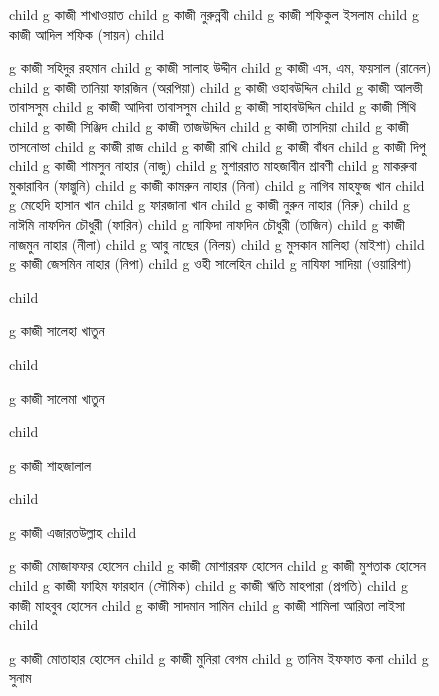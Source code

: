 \documentclass{article}
\begin{document}
\begin{figure}
{\begin{genealogypicture}
{{{{{{        }%
        child{
          g{ কাজী শাখাওয়াত  }
              child{   g{ কাজী নুরুন্নবী }  }
              child{
                g{ কাজী শফিকুল ইসলাম } child{  g{ কাজী আদিল শফিক (সায়ন)  } } 
              }
        }%
        child{
          g{ কাজী সহিদুর রহমান}
 child{    g{ কাজী সালাহ উদ্দীন } 
            child{    g{  কাজী এস, এম, ফয়সাল (রানেল) }   } %
            child{    g{ কাজী তানিয়া ফারজিন (অরপিয়া) }   }
      }
  child{    g{ কাজী ওহাবউদ্দিন  } 
      child{ g{ কাজী আলভী তাবাসসুম }  }
      child{ g{ কাজী আদিবা তাবাসসুম }  }
  }
 child{    g{ কাজী সাহাবউদ্দিন   } 
 child{    g{ কাজী সিঁথি }   }
  child{    g{ কাজী সিঞ্জিদ }   }
      }
  child{    g{ কাজী তাজউদ্দিন  } 
  child{ g{ কাজী তাসদিয়া }  }
 child{    g{ কাজী তাসনোভা }   }
  }
  child{    g{ কাজী রাজ } 
 child{    g{ কাজী রাখি  }   } %
 child{    g{ কাজী বাঁধন }   }
  }
  child{    g{ কাজী দিপু }   }
  child{    g{ কাজী শামসুন নাহার (নাজু)  } 
        child{ g{ মুশাররাত মাহজাবীন শ্রাবণী }  }
        child{ g{ মাকরুবা মুকারাবিন (ফাল্গুনি) }  }
  }
  child{    g{ কাজী কামরুন নাহার (নিনা) } 
      child{ g{  নাগিব মাহফুজ খান  }  }
      child{ g{  মেহেদি হাসান খান }  }
      child{ g{  ফারজানা খান }  }
    }
  child{    g{ কাজী নুরুন নাহার (নিরু) }  
          child{ g{ নাঈমি নাফদিন চৌধুরী (ফারিন) }  }
          child{ g{ নাফিদা নাফদিন চৌধুরী (তাজিন) }  }
   }
  child{    g{ কাজী নাজমুন নাহার (নীলা) }
        child{ g{ আবু নাছের (নিলয়) }  }
        child{ g{  মুসকান মালিহা (মাইশা)}  }
     }
  child{    g{ কাজী জেসমিন নাহার (নিপা)  } 
        child{ g{ ওহী সালেহিন  }  }
        child{ g{ নাযিফা সাদিয়া (ওয়ারিশা) }  }
    }
 

        }%
        child{
          g{ কাজী সালেহা খাতুন }

        }%
        child{
          g{ কাজী সালেমা খাতুন }

        }%
        child{
          g{ কাজী শাহজালাল }

        }
      }
        child{
        g{ কাজী এজারতউল্লাহ  }
          child{    g{ কাজী মোজাফফর হোসেন }
              child{
                g{ কাজী মোশাররফ হোসেন }
                  child{    g{ কাজী মুশতাক হোসেন }
                    child{    g{ কাজী ফাহিম ফারহান (সৌমিক) }   }
                    child{    g{ কাজী ঋতি মাহপারা (প্রগতি) }   }
                  }
                  child{    g{ কাজী মাহবুব হোসেন }
                    child{    g{ কাজী সাদমান সামিন  }   }
                    child{    g{ কাজী শামিলা আরিতা লাইসা }   }
                  }
              }
              child{
              g{ কাজী মোতাহার হোসেন  }
              child{    g{ কাজী মুনিরা বেগম } 
                    child{ g{ তানিম ইফফাত কনা }  }
                    child{ g{ সুনাম }  }
              }
              
}}}}}}}
\end{genealogypicture}}
\end{figure}
\end{document}
